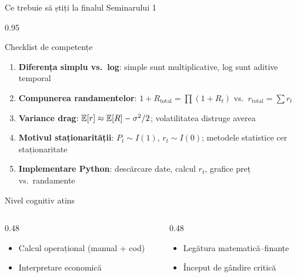 \documentclass[9pt, aspectratio=169, t]{beamer}
\begin{document}
\begin{frame}{Ce trebuie să știți la finalul Seminarului 1}
    \begin{cminipage}{0.95\textwidth}
    \begin{block}{Checklist de competențe}
    \begin{enumerate}\setlength{\itemsep}{0pt}
        \item[\checkmark] \textbf{Diferența simplu vs.\ log}: simple sunt multiplicative, log sunt aditive temporal
        \item[\checkmark] \textbf{Compunerea randamentelor}: $1 + R_{\text{total}} = \prod(1+R_t)$ vs.\ $r_{\text{total}} = \sum r_t$
        \item[\checkmark] \textbf{Variance drag}: $\mathbb{E}[r] \approx \mathbb{E}[R] - \sigma^2/2$; volatilitatea distruge averea
        \item[\checkmark] \textbf{Motivul staționarității}: $P_t \sim I(1)$, $r_t \sim I(0)$; metodele statistice cer staționaritate
        \item[\checkmark] \textbf{Implementare Python}: descărcare date, calcul $r_t$, grafice preț vs.\ randamente
    \end{enumerate}
    \end{block}
    \vspace{0.2cm}
    \begin{exampleblock}{Nivel cognitiv atins}
    \begin{columns}[T]
    \begin{column}{0.48\textwidth}
    \begin{itemize}\setlength{\itemsep}{0pt}
        \item Calcul operațional (manual + cod)
        \item Interpretare economică
    \end{itemize}
    \end{column}
    \begin{column}{0.48\textwidth}
    \begin{itemize}\setlength{\itemsep}{0pt}
        \item Legătura matematică--finanțe
        \item Început de gândire critică
    \end{itemize}
    \end{column}
    \end{columns}
    \end{exampleblock}
    \end{cminipage}
\end{frame}
\end{document}
